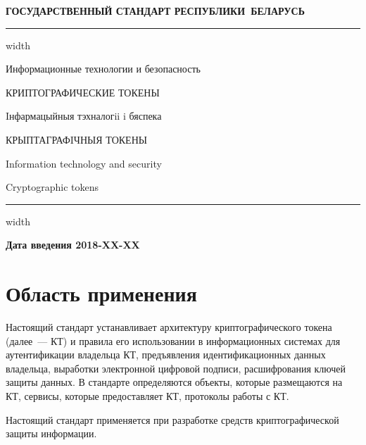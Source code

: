 \newpage
\setcounter{page}{1}
\pagestyle{headings}

\begin{center}
{\bfseries
ГОСУДАРСТВЕННЫЙ СТАНДАРТ РЕСПУБЛИКИ~БЕЛАРУСЬ
\vskip 2pt
\hrule width\textwidth

\vskip 9pt

Информационные технологии и безопасность

КРИПТОГРАФИЧЕСКИЕ ТОКЕНЫ

\vskip 9pt

Iнфармацыйныя тэхналогii i бяспека

КРЫПТАГРАФIЧНЫЯ ТОКЕНЫ
} %

\vskip 9pt

Information technology and security

Cryptographic tokens

\vskip 4pt                
\hrule width \textwidth
\end{center}

\mbox{}\hfill{\bfseries Дата введения 2018-XX-XX}

\chapter{Область применения}

Настоящий стандарт устанавливает архитектуру
криптографического токена (далее~--- КТ) и правила 
его использовании в информационных системах 
для аутентификации владельца КТ, предъявления идентификационных данных 
владельца, выработки электронной цифровой подписи, расшифрования ключей защиты 
данных.
%
В стандарте определяются объекты, которые размещаются на КТ,
сервисы, которые предоставляет КТ, протоколы работы с КТ.

Настоящий стандарт применяется при разработке средств криптографической 
защиты информации.

